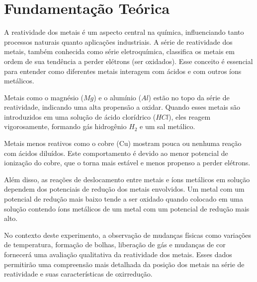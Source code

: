 \chapter{Fundamentação Teórica}
A reatividade dos metais é um aspecto central na química, influenciando tanto processos naturais quanto aplicações industriais. A série de reatividade dos metais, também conhecida como série eletroquímica, classifica os metais em ordem de sua tendência a perder elétrons (ser oxidados). Esse conceito é essencial para entender como diferentes metais interagem com ácidos e com outros íons metálicos.

Metais como o magnésio ($Mg$) e o alumínio ($Al$) estão no topo da série de reatividade, indicando uma alta propensão a oxidar. Quando esses metais são introduzidos em uma solução de ácido clorídrico ($HCl$), eles reagem vigorosamente, formando gás hidrogênio $H_{2}$ e um sal metálico.

Metais menos reativos como o cobre (Cu) mostram pouca ou nenhuma reação com ácidos diluídos. Este comportamento é devido ao menor potencial de ionização do cobre, que o torna mais estável e menos propenso a perder elétrons.

Além disso, as reações de deslocamento entre metais e íons metálicos em solução dependem dos potenciais de redução dos metais envolvidos. Um metal com um potencial de redução mais baixo tende a ser oxidado quando colocado em uma solução contendo íons metálicos de um metal com um potencial de redução mais alto. 
\cite{brown-electronegativity}

No contexto deste experimento, a observação de mudanças físicas como variações de temperatura, formação de bolhas, liberação de gás e mudanças de cor fornecerá uma avaliação qualitativa da reatividade dos metais. Esses dados permitirão uma compreensão mais detalhada da posição dos metais na série de reatividade e suas características de oxirredução.


